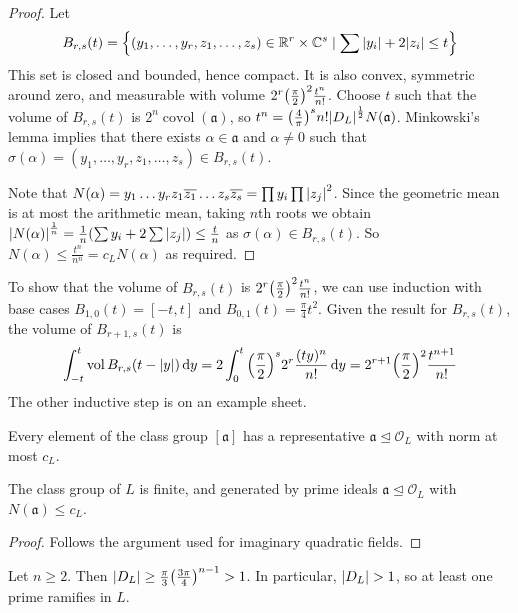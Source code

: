 \begin{proof}
    Let
    \[ B_{r,s}(t) = \qty{(y_1, \dots, y_r, z_1, \dots, z_s) \in \mathbb R^r \times \mathbb C^s \mid \sum \abs{y_i} + 2 \abs{z_i} \leq t} \]
    This set is closed and bounded, hence compact.
    It is also convex, symmetric around zero, and measurable with volume \( 2^r \qty(\frac{\pi}{2})^2 \frac{t^n}{n!} \).
    Choose \( t \) such that the volume of \( B_{r,s}(t) \) is \( 2^n \operatorname{covol}(\mathfrak a) \), so \( t^n = \qty(\frac{4}{\pi})^s n! \abs{D_L}^\frac{1}{2} N(\mathfrak a) \).
    Minkowski's lemma implies that there exists \( \alpha \in \mathfrak a \) and \( \alpha \neq 0 \) such that \( \sigma(\alpha) = (y_1, \dots, y_r, z_1, \dots, z_s) \in B_{r,s}(t) \).

    Note that \( N(\alpha) = y_1 \dots y_r z_1 \overline{z_1} \dots z_s \overline{z_s} = \prod y_i \prod \abs{z_j}^2 \).
    Since the geometric mean is at most the arithmetic mean, taking \( n \)th roots we obtain \( \abs{N(\alpha)}^{\frac{1}{n}} = \frac{1}{n}\qty(\sum y_i + 2 \sum \abs{z_j}) \leq \frac{t}{n} \) as \( \sigma(\alpha) \in B_{r,s}(t) \).
    So \( N(\alpha) \leq \frac{t^n}{n^n} = c_L N(\alpha) \) as required.
\end{proof}
To show that the volume of \( B_{r,s}(t) \) is \( 2^r \qty(\frac{\pi}{2})^2 \frac{t^n}{n!} \), we can use induction with base cases \( B_{1,0}(t) = [-t,t] \) and \( B_{0,1}(t) = \frac{\pi}{4} t^2 \).
Given the result for \( B_{r,s}(t) \), the volume of \( B_{r+1,s}(t) \) is
\[ \int_{-t}^t \operatorname{vol} B_{r,s}(t-\abs{y}) \dd{y} = 2\int_0^t \qty(\frac{\pi}{2})^s 2^r \frac{(ty)^n}{n!} \dd{y} = 2^{r+1} \qty(\frac{\pi}{2})^2 \frac{t^{n+1}}{n!} \]
The other inductive step is on an example sheet.
\begin{corollary}
    Every element of the class group \( [\mathfrak a] \) has a representative \( \mathfrak a \trianglelefteq \mathcal O_L \) with norm at most \( c_L \).
\end{corollary}
\begin{theorem}
    The class group of \( L \) is finite, and generated by prime ideals \( \mathfrak a \trianglelefteq \mathcal O_L \) with \( N(\mathfrak a) \leq c_L \).
\end{theorem}
\begin{proof}
    Follows the argument used for imaginary quadratic fields.
\end{proof}
\begin{theorem}
    Let \( n \geq 2 \).
    Then \( \abs{D_L} \geq \frac{\pi}{3} \qty(\frac{3\pi}{4})^{n-1} > 1 \).
    In particular, \( \abs{D_L} > 1 \), so at least one prime ramifies in \( L \).
\end{theorem}
